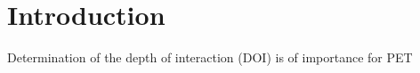\section{Introduction} 
Determination of the depth of interaction (DOI) is of importance for PET\cite{Moses_2001}